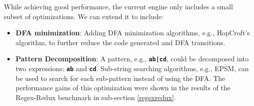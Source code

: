 While achieving good performance, the current engine only includes a small subset of optimizations. We can extend it to include:

\begin{itemize}
    \item \textbf{DFA minimization}: Adding DFA minimization algorithms, e.g., HopCroft's algorithm, to further reduce the code generated and DFA transitions.
    \item \textbf{Pattern Decomposition}: A pattern, e.g., \texttt{\textbf{ab|cd}}, could be decomposed into two expressions: \texttt{\textbf{ab}} and \texttt{\textbf{cd}}. Sub-string searching algorithms, e.g., EPSM, can be used to search for each sub-pattern instead of using the DFA. The performance gains of this optimization were shown in the results of the Regex-Redux benchmark in sub-section \ref{regexredux}.
\end{itemize}
